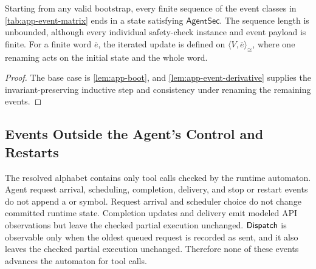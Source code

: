 \begin{corollary}
\label{cor:app-finite-sequence}
Starting from any valid bootstrap, every finite sequence of the event classes in \cref{tab:app-event-matrix} ends in a state satisfying \(\mathsf{AgentSec}\).
The sequence length is unbounded, although every individual safety-check instance and event payload is finite.
For a finite word \(\bar e\), the iterated update is defined on \(\langle V,\bar e\rangle_{\cong}\), where one renaming acts on the initial state and the whole word.
\end{corollary}

\begin{proof}
The base case is \cref{lem:app-boot}, and \cref{lem:app-event-derivative} supplies the invariant-preserving inductive step and consistency under renaming the remaining events.
\end{proof}

\subsection{Events Outside the Agent's Control and Restarts}
\label{app:restart}

The resolved alphabet contains only tool calls checked by the runtime automaton.
Agent request arrival, scheduling, completion, delivery, and stop or restart events do not append a \Fresh or \Alias symbol.
Request arrival and scheduler choice do not change committed runtime state.
Completion updates and delivery emit modeled API observations but leave the checked partial execution unchanged.
\(\mathsf{Dispatch}\) is observable only when the oldest queued request is recorded as sent, and it also leaves the checked partial execution unchanged.
Therefore none of these events advances the automaton for tool calls.

